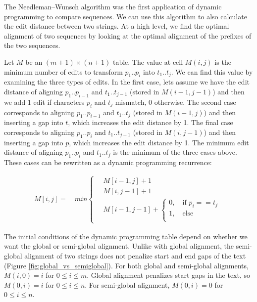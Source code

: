 The Needleman–Wunsch\cite{needleman_general_1970} algorithm was the first application of dynamic programming to compare sequences.
We can use this algorithm to also calculate the edit distance between two strings.
At a high level, we find the optimal alignment of two sequences by looking at the optimal alignment of the prefixes of the two sequences.

Let $M$ be an $(m+1) \times (n+1)$ table.  The value at cell $M(i,j)$ is the minimum number of edits to transform $p_1..p_i$ into $t_1..t_j$.
We can find this value by examining the three types of edits.
In the first case, lets assume we have the edit distance of aligning $p_1..p_{i-1}$ and $t_1..t_{j-1}$ (stored in $M(i-1,j-1)$) and then we add 1 edit if characters $p_i$ and $t_j$ mismatch, 0 otherwise.
The second case corresponds to aligning $p_1..p_{i-1}$ and $t_1..t_{j}$ (stored in $M(i-1,j)$) and then inserting a gap into $t$, which increases the edit distance by 1.
The final case corresponds to aligning $p_1..p_{i}$ and $t_1..t_{j-1}$ (stored in $M(i,j-1)$) and then inserting a gap into $p$, which increases the edit distance by 1.
The minimum edit distance of aligning $p_1..p_i$ and $t_1..t_j$ is the minimum of the three cases above.  These cases can be rewritten as a dynamic programming recurrence:

\begin{equation}
\begin{aligned}
M[i, j] = \quad min
\begin{cases}
\quad M[i - 1, j] + 1 \\
\quad M[i, j-1] + 1 \\
\quad M[i-1, j-1] + \begin{cases} 
0, \quad \text{if }p_i == t_j \\
1, \quad \text{else } \\
\end{cases}
\end{cases}
\end{aligned}
\end{equation}

The initial conditions of the dynamic programming table depend on whether we want the global or semi-global alignment.
Unlike with global alignment, the semi-global alignment of two strings does not penalize start and end gaps of the text (Figure \ref{fig:global_vs_semiglobal}).
For both global and semi-global alignments, $M(i,0) = i$ for $0 \leq i \leq m$.
Global alignment penalizes start gaps in the text, so $M(0,i) = i$ for $0 \leq i \leq n$.
For semi-global alignment, $M(0,i) = 0$ for $0 \leq i \leq n$.

